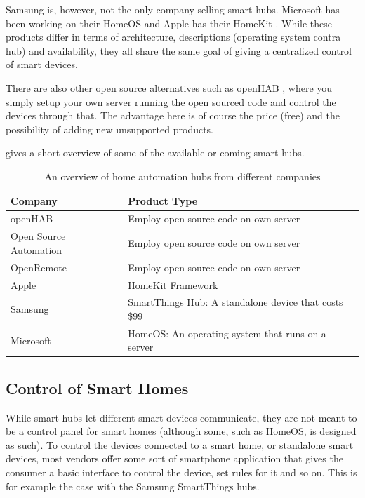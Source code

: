 Samsung is, however, not the only company selling smart hubs. 
Microsoft has been working on their HomeOS \cite{HOMEOS} and Apple has their HomeKit \cite{HOMEKIT}.
While these products differ in terms of architecture, descriptions (operating system contra hub) and availability,
they all share the same goal of giving a centralized control of smart devices. 

There are also other open source alternatives such as openHAB \cite{OPENHAB}, 
where you simply setup your own server running the open sourced code and control the devices through that. 
The advantage here is of course the price (free) and the possibility of adding new unsupported products. 

 gives a short overview of some of the available or coming smart hubs. 
\begin{table}
    \centering
    \begin{tabular}{l l}
        Company                           & Product Type \\ \hline
        openHAB \cite{OPENHAB}             & Employ open source code on own server \\
        Open Source Automation \cite{OSA}  & Employ open source code on own server \\
        OpenRemote \cite{OPENREMOTE}       & Employ open source code on own server \\
        Apple \cite{HOMEKIT}               & HomeKit Framework \\
        Samsung \cite{SMARTTHINGS}         & SmartThings Hub: A standalone device that costs \$99 \\
        Microsoft \cite{HOMEOS}            & HomeOS: An operating system that runs on a server
    \end{tabular}
    \caption{An overview of home automation hubs from different companies}
    \label{table:smarthubs}
\end{table}

\subsection{Control of Smart Homes}\label{sec:smarthomecontrol}
While smart hubs let different smart devices communicate, 
they are not meant to be a control panel for smart homes (although some, such as HomeOS, is designed as such).
To control the devices connected to a smart home, or standalone smart devices, 
most vendors offer some sort of smartphone application that gives the consumer a basic interface to control the device, set rules for it and so on.
This is for example the case with the Samsung SmartThings hubs. 

